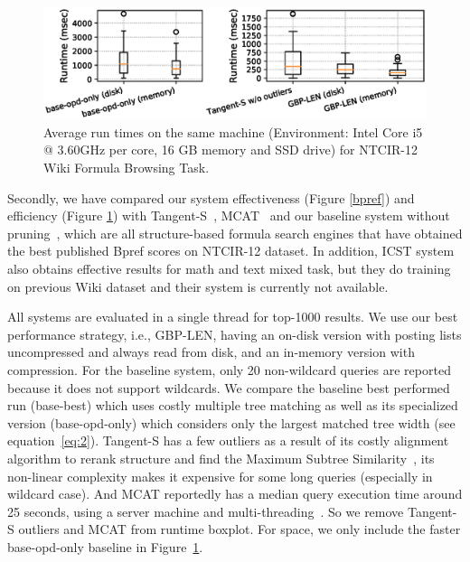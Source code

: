 \documentclass[runningheads]{llncs}
\begin{document}
\begin{figure}[]
\begin{center}
\hspace*{-0.1in}

\includegraphics[width=\textwidth]{fig/boxplot.eps}
\vspace{-0.25in}

\caption{Average run times on the same machine (Environment: Intel Core i5 @ 3.60GHz per core, 16 GB memory and SSD drive) for NTCIR-12 Wiki Formula Browsing Task.}
\label{boxplot}
\end{center}

\end{figure}

Secondly, we have compared our system effectiveness (Figure \ref{bpref}) and efficiency (Figure \ref{boxplot}) with Tangent-S~\cite{tangent-combine2017}, MCAT~\cite{mcat_16} and our baseline system without pruning~\cite{a0_2019},
which are all structure-based formula search engines  that have obtained the best published Bpref scores on NTCIR-12 dataset.
In addition, ICST system~\cite{peking2016} also obtains effective results for math and text mixed task, but they do training on previous Wiki dataset and their system is currently not available.

All systems are evaluated in a single thread for top-1000 results.
%
We use our best performance strategy, i.e., GBP-LEN, having an on-disk version with posting lists uncompressed and always read from disk, and an in-memory version with compression.
%
For the baseline system, only 20 non-wildcard queries are reported because it does not support wildcards. 
We compare the baseline best performed run (base-best) which uses costly multiple tree matching as well as its specialized version (base-opd-only) which considers only the largest matched tree width (see equation~\ref{eq:2}).
%
Tangent-S has a few outliers as a result of its costly alignment algorithm to rerank structure and find the Maximum Subtree Similarity~\cite{tangent-multistage2016}, its non-linear complexity makes it expensive for some long queries (especially in wildcard case).
%
And MCAT reportedly has a median query execution time around 25 seconds, using a server machine and multi-threading~\cite{mcat_16}.
So we remove Tangent-S outliers and MCAT from runtime boxplot.
For space, we only include the faster base-opd-only baseline in Figure~\ref{boxplot}.
\end{document}
